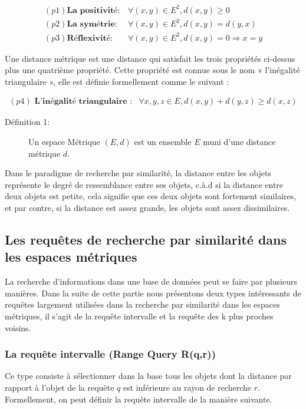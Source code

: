 \begin{equation}
	\begin{array}{cc}
	(p1) \textbf{La positivité} : & \forall (x,y)\in E^2, d(x,y) \ge 0 \\
	(p2) \textbf{La symétrie} : & \forall (x,y)\in E^2, d(x,y) = d(y,x) \\
	(p3) \textbf{Réflexivité} : & \forall (x,y)\in E^2, d(x,y) = 0 \Rightarrow x = y
	\end{array}
\end{equation}

Une distance métrique est une distance qui satisfait les trois propriétés ci-dessus plus une quatrième propriété. Cette propriété est connue sous le nom « l’inégalité triangulaire », elle est définie formellement comme le suivant :

\begin{equation}
\begin{array}{cc}
(p4)\textbf{ L’inégalité triangulaire :}  & \forall x,y,z\in E, d(x,y)+d(y,z) \geq d(x,z)
\end{array}
\end{equation}

\begin{description}
	\item[Définition 1:] Un espace Métrique $ (E,d) $ est un ensemble $ E $ muni d’une distance métrique $ d $.
\end{description}

Dans le paradigme de recherche par similarité, la distance entre les objets représente le degré de ressemblance entre ses objets, c.à.d si la distance entre deux objets est petite, cela signifie que ces deux objets sont fortement similaires, et par contre, si la distance est assez grande, les objets sont assez dissimilaires.

\subsection{Les requêtes de recherche par similarité dans les espaces métriques}
La recherche d’informations dans une base de données peut se faire par plusieurs manières. Dans la suite de cette partie nous présentons deux types intéressants de requêtes largement utilisées dans la recherche par similarité dans les espaces métriques, il s’agit de la requête intervalle et la requête des k plus proches voisins.

\subsubsection{La requête intervalle (Range Query R(q,r))}
Ce type consiste à sélectionner dans la base tous les objets dont la distance par rapport à l’objet de la requête $ q $ est inférieure au rayon de recherche $ r $. Formellement, on peut définir la requête intervalle de la manière suivante.\\


